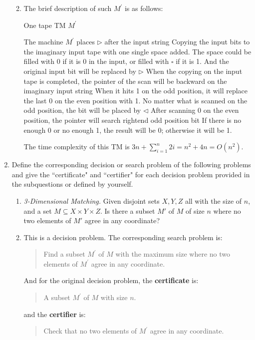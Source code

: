 \documentclass[12pt,a4paper]{article}
\makeatletter
\newtheorem*{solution}{Solution}
\theoremstyle{definition}
\renewenvironment{solution}[1][Solution] {\par\pushQED{\qed}\normalfont\topsep6\p@\@plus6\p@\relax\trivlist\item[\hskip\labelsep\bfseries#1\@addpunct{.}]\ignorespaces}{\popQED\endtrivlist\@endpefalse} \makeatother
\makeatother
\begin{document}
\begin{enumerate}
\begin{enumerate}
\begin{solution}
		The brief description of such $M^\prime$ is as follows:
		
		\begin{algorithm}[h]
			\caption{One tape TM $M^\prime$}
			The machine $M^\prime$ places $\triangleright$ after the input string\;
			Copying the input bits to the imaginary input tape with one single space added. The space could be filled with 0 if it is 0 in the input, or filled with $\square$ if it is 1. And the original input bit will be replaced by $\triangleright$\;
			When the copying on the input tape is completed, the pointer of the scan will be backward on the imaginary input string\;
			When it hits 1 on the odd position, it will replace the last 0 on the even position with 1. No matter what is scanned on the odd position, the bit will be placed by $\triangleleft$\;
			After scanning 0 on the even position, the pointer will search rightend odd position bit\;
			If there is no enough 0 or no enough 1, the result will be 0; otherwise it will be 1.
		\end{algorithm}

		The time complexity of this TM is $3n+\sum_{i=1}^{n} 2i=n^2+4n=O(n^2)$.
	\end{solution}

	\end{enumerate}
	
	\item Define the corresponding decision or search problem of the following problems and give the ``certificate" and ``certifier" for each decision problem provided in the subquestions or defined by yourself.
	
	\begin{enumerate}
	    \item
	    \textit{3-Dimensional Matching.}  Given disjoint sets $X,Y,Z$ all with the size of $n$, and a set $M \subseteq X\times Y\times Z$.  Is there a subset $M'$ of $M$ of size $n$ where no two elements of $M'$ agree in any coordinate?

		\begin{solution}
			This is a decision problem. The corresponding search problem is:
			\begin{quotation}
				Find a subset $M^\prime$ of $M$ with the maximum size where no two elements of $M^\prime$ agree in any coordinate.
			\end{quotation}
			And for the original decision problem, the \textbf{certificate} is:
			\begin{quotation}
				A subset $M^\prime$ of $M$ with size $n$.
			\end{quotation}
			and the \textbf{certifier} is:
			\begin{quotation}
				Check that no two elements of $M^\prime$ agree in any coordinate.
			\end{quotation}
		\end{solution}
	    

\end{enumerate}
\end{enumerate}
\end{document}
